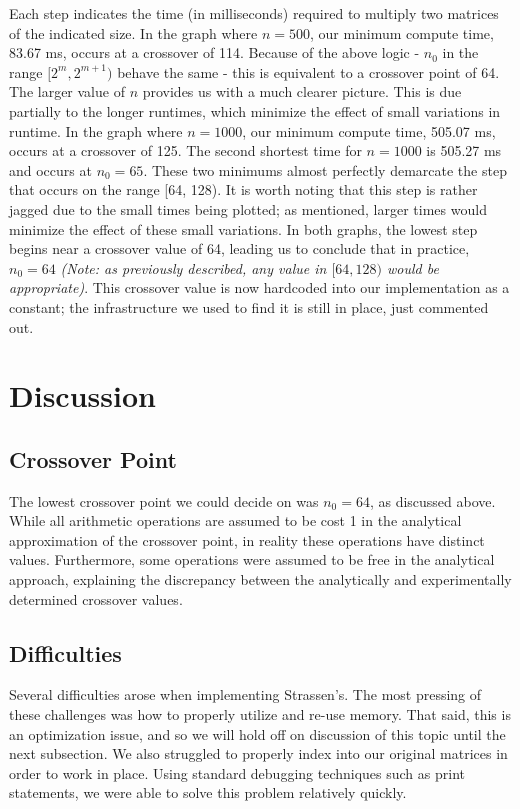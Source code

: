 \documentclass[solution, letterpaper]{cs121}
\begin{document}
Each step indicates the time (in milliseconds) required to multiply two matrices of the indicated size. In the graph where $n=500$, our minimum compute time, 83.67 ms, occurs at a crossover of 114. Because of the above logic - $n_0$ in the range $[2^m,2^{m+1})$ behave the same - this is equivalent to a crossover point of 64. The larger value of $n$ provides us with a much clearer picture. This is due partially to the longer runtimes, which minimize the effect of small variations in runtime. In the graph where $n=1000$, our minimum compute time, 505.07 ms, occurs at a crossover of 125. The second shortest time for $n = 1000$ is 505.27 ms and occurs at $n_0 = 65$. These two minimums almost perfectly demarcate the step that occurs on the range [64, 128). It is worth noting that this step is rather jagged due to the small times being plotted; as mentioned, larger times would minimize the effect of these small variations. In both graphs, the lowest step begins near a crossover value of 64, leading us to conclude that in practice, $n_0 = 64$ \textit{(Note: as previously described, any value in $[64,128)$ would be appropriate)}. This crossover value is now hardcoded into our implementation as a constant; the infrastructure we used to find it is still in place, just commented out.

\section*{Discussion}

\subsection*{Crossover Point}
\hspace{4mm} The lowest crossover point we could decide on was $n_0 = 64$, as discussed above. While all arithmetic operations are assumed to be cost 1 in the analytical approximation of the crossover point, in reality these operations have distinct values. Furthermore, some operations were assumed to be free in the analytical approach, explaining the discrepancy between the analytically and experimentally determined crossover values.

\subsection*{Difficulties}
\hspace{4mm} Several difficulties arose when implementing Strassen's. The most pressing of these challenges was how to properly utilize and re-use memory. That said, this is an optimization issue, and so we will hold off on discussion of this topic until the next subsection. We also struggled to properly index into our original matrices in order to work in place. Using standard debugging techniques such as print statements, we were able to solve this problem relatively quickly.
\end{document}
